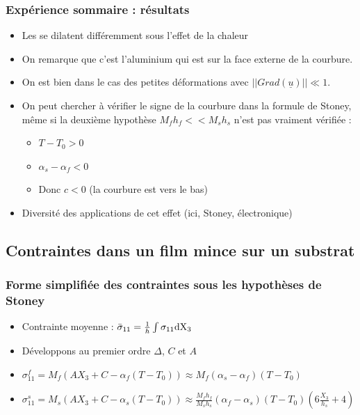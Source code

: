 \begin{frame}
\frametitle{Expérience sommaire : résultats}
    \begin{itemize}
        \item Les se dilatent différemment sous l'effet de la chaleur
        \item On remarque que c'est l'aluminium qui est sur la face externe de la courbure. 
        \item On est bien dans le cas des petites déformations avec $||Grad(\underline{u})|| \ll 1$.
        \item On peut chercher à vérifier le signe de la courbure dans la formule de Stoney, même si la deuxième hypothèse $M_f h_f << M_s h_s$ n'est pas vraiment vérifiée :
        \begin{itemize}    
            \item $T-T_0 > 0$
            \item $\alpha_s - \alpha_f < 0$
            \item Donc $c < 0$ (la courbure est vers le bas)
        \end{itemize}
        \item Diversité des applications de cet effet (ici, Stoney, électronique)
    \end{itemize}
\end{frame}



\subsection{Contraintes dans un film mince sur un substrat} %

\begin{frame}
\frametitle{Forme simplifiée des contraintes sous les hypothèses de Stoney}
\begin{itemize}
    \item Contrainte moyenne : $\bar{\sigma}_{11}=\frac{1}{h}\int\sigma_{11}\rm{d}X_3$
    \item Développons au premier ordre $\Delta$, $C$ et $A$
    \item $\sigma_{11}^f=M_f(AX_3+C-\alpha_f(T-T_0)) \approx M_f (\alpha_s - \alpha_f)(T-T_0)$
    \item $\sigma_{11}^s=M_s(AX_3+C-\alpha_s(T-T_0)) \approx \frac{M_fh_f}{M_sh_s} (\alpha_f-\alpha_s)(T-T_0)(6\frac{X_3}{h_s}+4)$
\end{itemize}
\end{frame}

